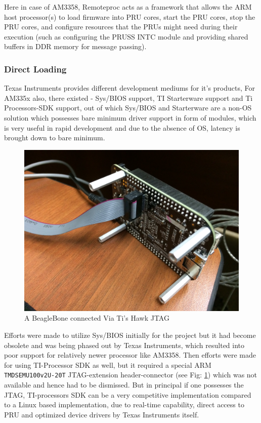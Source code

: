  Here in case of AM3358, Remoteproc acts as a framework that allows the ARM host processor(s) to load firmware into PRU cores, start the PRU cores, stop the PRU cores, and configure resources that the PRUs might need during their execution (such as configuring the PRUSS INTC module and providing shared buffers in DDR memory for message passing).

\subsubsection{Direct Loading}
Texas Instruments provides different development mediums for it's products, For  AM335x also, there existed - Sys/BIOS support, TI Starterware support and Ti Processors-SDK support, out of which Sys/BIOS and Starterware are a non-OS solution which possesses bare minimum driver support in form of modules, which is very useful in rapid development and due to the absence of OS, latency is brought down to bare minimum.
\begin{figure}[h]
	\centering
	\includegraphics[width=\textwidth/2]{fig/bbb_jtag.jpg}
	\caption{A BeagleBone connected Via Ti's Hawk JTAG}
	\label{fig:BBB JTAG}
\end{figure}

Efforts were made to utilize Sys/BIOS initially for the project but it had become obsolete and was being phased out by Texas Instruments, which resulted into poor support for relatively newer processor like AM3358. Then efforts were made for using TI-Processor SDK as well, but it required a special ARM \texttt{TMDSEMU100v2U-20T} JTAG-extension header-connector (see Fig: \ref{fig:BBB JTAG}) which was not available and hence had to be dismissed. But in principal if one possesses the JTAG, TI-processors SDK can be a very competitive implementation compared to a Linux based implementation, due to real-time capability, direct access to PRU and optimized device drivers by Texas Instruments itself.


